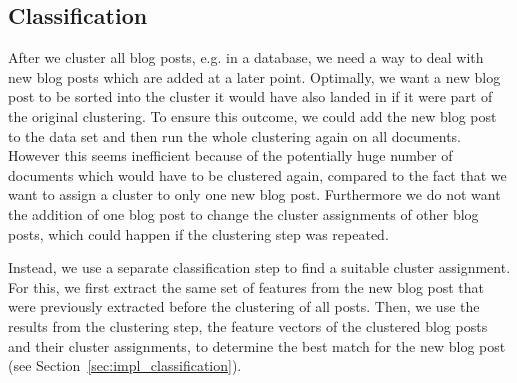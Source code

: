 
\subsection{Classification}
\label{sec:classification}


After we cluster all blog posts, e.g. in a database, we need a way to deal with new blog posts which are added at a later point.
Optimally, we want a new blog post to be sorted into the cluster it would have also landed in if it were part of the original clustering.
To ensure this outcome, we could add the new blog post to the data set and then run the whole clustering again on all documents.
However this seems inefficient because of the potentially huge number of documents which would have to be clustered again, compared to the fact that we want to assign a cluster to only one new blog post.
Furthermore we do not want the addition of one blog post to change the cluster assignments of other blog posts, which could happen if the clustering step was repeated.


Instead, we use a separate classification step to find a suitable cluster assignment.
For this, we first extract the same set of features from the new blog post that were previously extracted before the clustering of all posts.
Then, we use the results from the clustering step, the feature vectors of the clustered blog posts and their cluster assignments, to determine the best match for the new blog post (see Section~\ref{sec:impl_classification}).